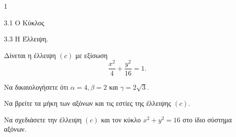 \begin{ylh}{1}
    \item 3.1 Ο Κύκλος
    \item 3.3 Η Έλλειψη.
\end{ylh}
Δίνεται η έλλειψη $(c)$ με εξίσωση
\[ \frac{x^2}{4} + \frac{y^2}{16} = 1. \]
\begin{alist}
\item Να δικαιολογήσετε ότι $α = 4, β = 2$ και $\gamma = 2\sqrt{3}$. 
\item Να βρείτε τα μήκη των αξόνων και τις εστίες της έλλειψης $(c)$. 
\item Να σχεδιάσετε την έλλειψη $(c)$ και τον κύκλο $x^2 + y^2 = 16$ στο ίδιο σύστημα αξόνων. 
\end{alist}